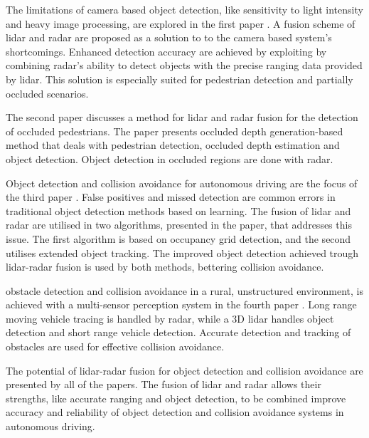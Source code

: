 The limitations of camera based object detection, like sensitivity to light intensity and heavy image processing, are explored in the first paper \cite{7579940}. A fusion scheme of lidar and radar are proposed as a solution to to the camera based system's shortcomings. Enhanced detection accuracy are achieved by exploiting by combining radar's ability to detect objects with the precise ranging data provided by lidar. This solution is especially suited for pedestrian detection and partially occluded scenarios.

The second paper \cite{8561087} discusses a method for lidar and radar fusion for the detection of occluded pedestrians. The paper presents occluded depth generation-based method that deals with pedestrian detection, occluded depth estimation and object detection. Object detection in occluded regions are done with radar.

Object detection and collision avoidance for autonomous driving are the focus of the third paper \cite{9951730}. False positives and missed detection are common errors in traditional object detection methods based on learning. The fusion of lidar and radar are utilised in two algorithms, presented in the paper, that addresses this issue. The first algorithm is based on occupancy grid detection, and the second utilises extended object tracking. The improved object detection achieved trough lidar-radar fusion is used by both methods, bettering collision avoidance.

obstacle detection and collision avoidance in a rural, unstructured environment, is achieved with a multi-sensor perception system in the fourth paper \cite{6916120}. Long range moving vehicle tracing is handled by radar, while a 3D lidar handles object detection and short range vehicle detection. Accurate detection and tracking of obstacles are used for effective collision avoidance.

The potential of lidar-radar fusion for object detection and collision avoidance are presented by all of the papers. The fusion of lidar and radar allows their strengths, like accurate ranging and object detection, to be combined improve accuracy and reliability of object detection and collision avoidance systems in autonomous driving.